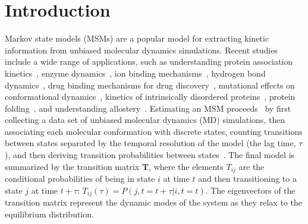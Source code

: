 \documentclass[journal=jacsat,manuscript=article]{achemso}
\begin{document}
\section{Introduction}

Markov state models (MSMs) are a popular model for extracting kinetic information from unbiased molecular dynamics simulations. Recent studies include a wide range of applications, such as understanding protein association kinetics~\cite{cannariato_prediction_2022, chakrabarti_litmus_2022}, enzyme dynamics~\cite{koulgi_structural_2021}, ion binding mechanisms~\cite{dutta_distinct_2022, mckiernan_dynamical_2020}, hydrogen bond dynamics~\cite{ibrahim_dynamics_2022}, drug binding mechanisms for drug discovery~\cite{hu_discovery_2022, pantsar_decisive_2022, hempel_molecular_2021, tosstorff_study_2020, liu_silico_2021}, mutational effects on conformational dynamics~\cite{fernandez-quintero_mutation_2021, sharma_comparative_2020, juarez-jimenezDynamicDesignManipulation2020b, wapeesittipanAllostericEffectsCyclophilin2019a}, kinetics of intrinsically disordered proteins~\cite{paul_diversity_2020}, protein folding~\cite{zhou_molecular_2021}, and understanding allostery~\cite{tian_deciphering_2020, bowman_msmallosteric_2015, pontiggia_msmcprotein_2015}. Estimating an MSM proceeds~\cite{noe_markov_2019} by first collecting a data set of unbiased molecular dynamics (MD) simulations, then associating each molecular conformation with discrete states, counting transitions between states separated by the temporal resolution of the model (the lag time, $\tau$), and then deriving transition probabilities between states~\cite{trendelkamp-schroer_estimation_2015}. The final model is summarized by the transition matrix $\mathbf{T}$, where the elements $T_{ij}$ are the conditional probabilities of being in state $i$ at time $t$ and then transitioning to a state $j$ at time $t{+}\tau$: $T_{ij}(\tau){=}P(j, t{=}t{+}\tau| i, t{=}t)$.  The eigenvectors of the transition matrix represent the dynamic modes of the system as they relax to the equilibrium distribution. 
\end{document}
